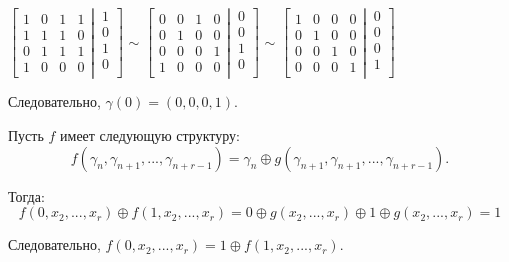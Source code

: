 $
\left[
  \begin{matrix}
1 &0 &1 &1\\
1 &1 &1 &0 \\
0 &1 &1 &1 \\
1 &0 &0 &0
  \end{matrix}
  \left|
    \,
    \begin{matrix}
      1  \\
      0  \\
      1  \\
      0  \\
    \end{matrix}
  \right.
\right]
$
$\sim$
$
\left[
  \begin{matrix}
0 &0 &1 &0\\
0 &1 &0 &0 \\
0 &0 &0 &1 \\
1 &0 &0 &0
  \end{matrix}
  \left|
    \,
    \begin{matrix}
      0  \\
      0  \\
      1  \\
      0  \\
    \end{matrix}
  \right.
\right]
$
$\sim$
$
\left[
  \begin{matrix}
	1 &0 &0 &0 \\
	0 &1 &0 &0 \\
	0 &0 &1 &0 \\
	0 &0 &0 &1
  \end{matrix}
  \left|
    \,
    \begin{matrix}
      0  \\
      0  \\
      0  \\
      1  \\
    \end{matrix}
  \right.
\right]
$

Следовательно, $\gamma(0) = (0, 0, 0, 1)$.


Пусть $f$ имеет следующую структуру: $$f(\gamma_n, \gamma_{n+1}, ..., \gamma_{n + r - 1}) = \gamma_n \oplus g(\gamma_{n+1}, \gamma_{n+1}, ..., \gamma_{n + r - 1}).$$

\noindent Тогда: $$f(0, x_2, ...,x_r) \oplus f(1, x_2, ...,x_r) = 0 \oplus g(x_2, ...,x_r) \oplus 1 \oplus g(x_2, ...,x_r) = 1$$

\noindent Следовательно, $f(0, x_2, ...,x_r) = 1 \oplus f(1, x_2, ...,x_r).$


